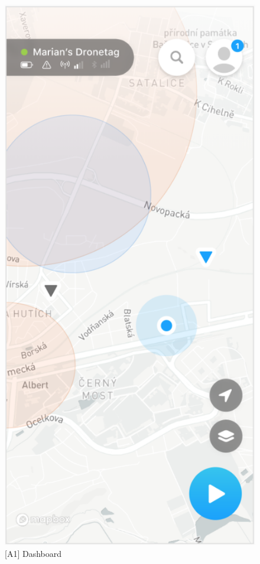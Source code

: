 \begin{figure}
\begin{minipage}{.45\textwidth}
        \includegraphics[width=.7\linewidth]{assets/user_interface_design/dashboard/dashboard.png}
        \caption{[A1] Dashboard}
        \label{fig:dashboard}
    \end{minipage}
    \label{fig:dashboard_all}
\end{figure}

